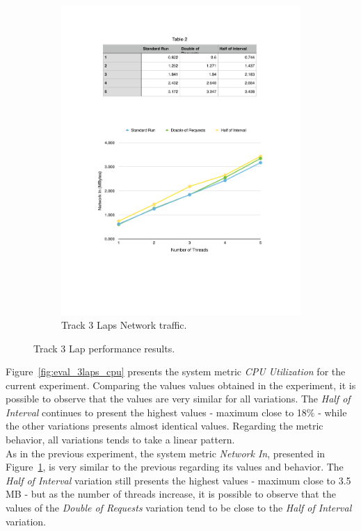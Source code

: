 \begin{figure}[ht!]
\begin{subfigure}{.5\textwidth}
  \includegraphics[width=\linewidth]{./images/network_3_lap}
  \caption{Track 3 Laps Network traffic.}
  \label{fig:eval_3laps_network}
\end{subfigure}
\caption{Track 3 Lap performance results.}
\label{fig:eval_3laps_results}
\end{figure}

Figure~\ref{fig:eval_3laps_cpu} presents the system metric \textit{CPU Utilization} for the current
experiment. Comparing the values values obtained in the experiment, it is possible to observe that
the values are very similar for all variations. The \textit{Half of Interval} continues to present
the highest values - maximum close to 18$\%$ - while the other variations presents almost identical
values. Regarding the metric behavior, all variations tends to take a linear pattern.\\

As in the previous experiment, the system metric \textit{Network In}, presented in Figure~\ref{fig:eval_3laps_network},
is very similar to the previous regarding its values and behavior. The \textit{Half of Interval}
variation still presents the highest values - maximum close to 3.5 \gls{MB} - but as the number of
threads increase, it is possible to observe that the values of the \textit{Double of Requests}
variation tend to be close to the \textit{Half of Interval} variation.


